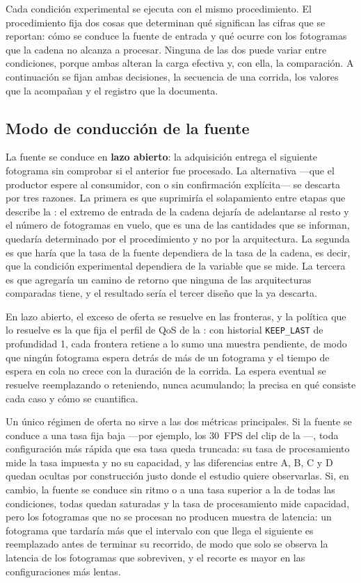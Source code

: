 Cada condición experimental se ejecuta con el mismo procedimiento. El
procedimiento fija dos cosas que determinan qué significan las cifras que se
reportan: cómo se conduce la fuente de entrada y qué ocurre con los
fotogramas que la cadena no alcanza a procesar. Ninguna de las dos puede
variar entre condiciones, porque ambas alteran la carga efectiva y, con
ella, la comparación. A continuación se fijan ambas decisiones, la secuencia
de una corrida, los valores que la acompañan y el registro que la documenta.

\subsection{Modo de conducción de la fuente}
\label{sec:driving}

La fuente se conduce en \textbf{lazo abierto}: la adquisición entrega el
siguiente fotograma sin comprobar si el anterior fue procesado. La
alternativa ---que el productor espere al consumidor, con o sin confirmación
explícita--- se descarta por tres razones. La primera es que suprimiría el
solapamiento entre etapas que describe la : el extremo
de entrada de la cadena dejaría de adelantarse al resto y el número de
fotogramas en vuelo, que es una de las cantidades que se informan, quedaría
determinado por el procedimiento y no por la arquitectura. La segunda es que
haría que la tasa de la fuente dependiera de la tasa de la cadena, es decir,
que la condición experimental dependiera de la variable que se mide. La
tercera es que agregaría un camino de retorno que ninguna de las
arquitecturas comparadas tiene, y el resultado sería el tercer diseño que la
 ya descarta.

En lazo abierto, el exceso de oferta se resuelve en las fronteras, y la
política que lo resuelve es la que fija el perfil de QoS de la
: con historial \texttt{KEEP\_LAST} de profundidad 1, cada
frontera retiene a lo sumo una muestra pendiente, de modo que ningún
fotograma espera detrás de más de un fotograma y el tiempo de espera en cola
no crece con la duración de la corrida. La espera eventual se resuelve
reemplazando o reteniendo, nunca acumulando; la  precisa
en qué consiste cada caso y cómo se cuantifica.

Un único régimen de oferta no sirve a las dos métricas principales. Si la
fuente se conduce a una tasa fija baja ---por ejemplo, los 30~FPS del clip
de la ---, toda configuración más rápida que esa
tasa queda truncada: su tasa de procesamiento mide la tasa impuesta y no su
capacidad, y las diferencias entre A, B, C y D quedan ocultas por
construcción justo donde el estudio quiere observarlas. Si, en cambio, la
fuente se conduce sin ritmo o a una tasa superior a la de todas las
condiciones, todas quedan saturadas y la tasa de procesamiento mide
capacidad, pero los fotogramas que no se procesan no producen muestra de
latencia: un fotograma que tardaría más que el intervalo con que llega el
siguiente es reemplazado antes de terminar su recorrido, de modo que solo se
observa la latencia de los fotogramas que sobreviven, y el recorte es mayor
en las configuraciones más lentas.

